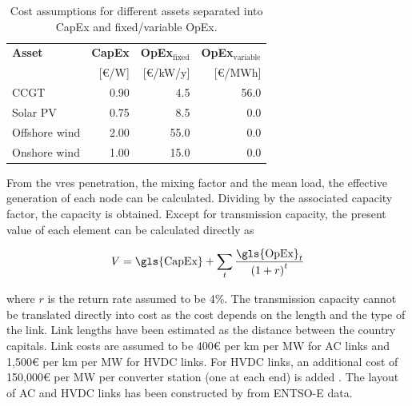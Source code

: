 \documentclass[a4paper, 5p, sort&compress]{elsarticle}%
\newcommand{\paren}[1]{\left(#1\right)}
\begin{document}
\begin{table}[h!]
  \centering
  \caption{Cost assumptions for different assets separated into
    \gls{CapEx} and fixed/variable \gls{OpEx}.}
  \label{tab:cost-assumptions}
  \begin{tabular}{lrrr}  \toprule
    \textbf{Asset} & \textbf{\gls{CapEx} }& \textbf{\gls{OpEx}$_{\text{fixed}}$} & \textbf{\gls{OpEx}$_{\text{variable}}$}\\
    & [\euro/W] & [\euro/kW/y] & [\euro/MWh]\\ \midrule
    CCGT & 0.90 & 4.5 & 56.0\\
    Solar PV & 0.75 & 8.5 & 0.0\\
    Offshore wind & 2.00 & 55.0 & 0.0\\
    Onshore wind & 1.00 & 15.0 & 0.0\\
    \bottomrule
  \end{tabular}
\end{table}

From the \gls{vres} penetration, the mixing factor and the mean load, the
effective generation of each node can be calculated. Dividing by the
associated capacity factor, the capacity is obtained. Except for
transmission capacity, the present value of each element can be
calculated directly as

\begin{equation}
  \label{eq:6}
  V = \text{\gls{CapEx}} + \sum_{t} \frac{\text{\gls{OpEx}}_{t}}{\paren{1 + r}^{t}}
\end{equation}

where $r$
is the return rate assumed to be 4\%. The transmission capacity cannot be translated directly
into cost as the cost depends on the length and the type of the link. Link lengths have been
estimated as the distance between the country capitals. Link costs are assumed to be 400\euro{}
per km per MW for AC links and 1,500\euro{}
per km per MW for HVDC links. For HVDC links, an additional cost of 150,000\euro{}
per MW per converter station (one at each end) is added \cite{McKinsey, Schaber, Schaber2}. The
layout of AC and HVDC links has been constructed by \cite{rolando2014} from ENTSO-E data.

\end{document}
